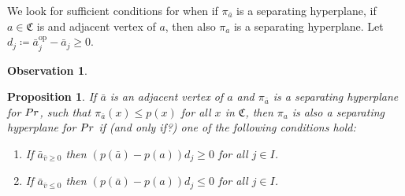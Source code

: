 \documentclass{article}
\newtheorem{proposition}[theorem]{Proposition}
\newtheorem{observation}[theorem]{Observation}
\begin{document}
We look for sufficient conditions for when if \(\pi_{\bar{a}}\) is a separating hyperplane, if \(a \in \mathfrak{C}\) is and adjacent vertex of \(a\), then also \(\pi_a\) is a separating hyperplane.
Let \(d_j \coloneqq \bar{a}^{\text{op}}_j - \bar{a}_j \geq 0 \).

\begin{observation}
	
\end{observation}
\begin{proposition}
	If \(\bar{a}\) is an adjacent vertex of \(a\) and \(\pi_{\bar{a}}\) is a separating hyperplane for \(Pr\), 
	such that \(\pi_{\bar{a}}(x) \leq p(x)\) for all \(x\) in \(\mathfrak{C}\), then \(\pi_a\) is also a separating hyperplane for \(Pr\) if (and only if?) one of the following conditions hold:
	\begin{enumerate}
		\item If \(\bar{a}_{\bar{v} \geq 0}\) then  \((p(\bar{a})- p(a))d_j \geq 0\) for all \(j \in I\).
		\item If \(\bar{a}_{\bar{v} \leq 0}\) then \((p(\bar{a})- p(a))d_j \leq 0\) for all \(j \in I\).
	\end{enumerate}
\end{proposition}
\end{document}
